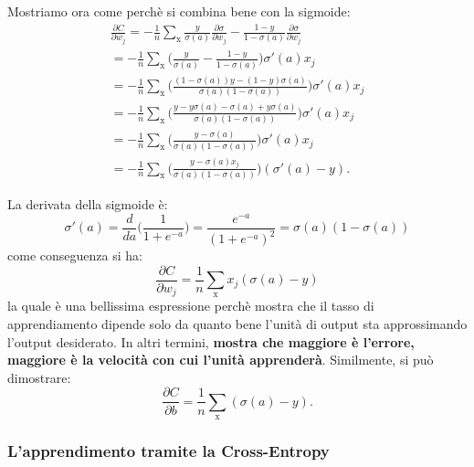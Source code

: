 Mostriamo ora come perchè si combina bene con la sigmoide:
\begin{equation}
    \begin{array}{l}
    \frac{\partial C}{\partial w_j}=-\frac{1}{n}\sum_\text{x}\frac{y}{\sigma(a)}\frac{\partial \sigma}{\partial w_j}-\frac{1-y}{1-\sigma(a)}\frac{\partial \sigma}{\partial w_j}\\
    =-\frac{1}{n}\sum_\text{x}\Big( \frac{y}{\sigma(a)}-\frac{1-y}{1-\sigma(a)} \Big) \sigma'(a)x_j\\
    =-\frac{1}{n}\sum_\text{x}\Big( \frac{(1-\sigma(a))y-(1-y)\sigma(a)}{\sigma(a)(1-\sigma(a))}\Big) \sigma'(a)x_j\\
    =-\frac{1}{n}\sum_\text{x}\Big( \frac{y-y\sigma(a)-\sigma(a)+y\sigma(a)}{\sigma(a)(1-\sigma(a))}\Big) \sigma'(a)x_j\\
    =-\frac{1}{n}\sum_\text{x}\Big( \frac{y-\sigma(a)}{\sigma(a)(1-\sigma(a))}\Big) \sigma'(a)x_j\\
    =-\frac{1}{n}\sum_\text{x}\Big( \frac{y-\sigma(a)x_j}{\sigma(a)(1-\sigma(a))}\Big) (\sigma'(a)-y).
    \end{array}
\end{equation}

La derivata della sigmoide è:
\begin{equation}
    \sigma'(a)=\frac{d}{da}\Big(\frac{1}{1+e^{-a}} \Big)=
    \frac{e^{-a}}{(1+e^{-a})^2}=\sigma(a)(1-\sigma(a))
\end{equation}
come conseguenza si ha:
\begin{equation}
    \frac{\partial C}{\partial w_j}=\frac{1}{n}\sum_\text{x}x_j(\sigma(a)-y)
\end{equation}
la quale è una bellissima espressione perchè mostra che il tasso di apprendiamento dipende solo da quanto bene l'unità di output sta approssimando l'output desiderato. In altri termini, \textbf{mostra che maggiore è l'errore, maggiore è la velocità con cui l'unità apprenderà}.
\newline
\newline
Similmente, si può dimostrare:
\begin{equation}
    \frac{\partial C}{\partial b}=\frac{1}{n}\sum_\text{x}(\sigma(a)-y).
\end{equation}
\subsubsection{L'apprendimento tramite la Cross-Entropy}


